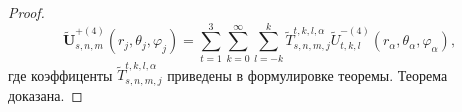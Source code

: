 \begin{proof}
\begin{equation}
\mathbf{\tilde U}_{s,n,m}^{+(4)}(r_j,\theta_j,\varphi_j)=\sum\limits_{t=1}^3\sum\limits_{k=0}^\infty\sum\limits_{l=-k}^k\tilde T_{s,n,m,j}^{t,k,l,\alpha}\tilde U_{t,k,l}^{-(4)}(r_\alpha,\theta_\alpha,\varphi_\alpha),
\label{eq:1:122r}
\end{equation}
где коэффиценты $\tilde T_{s,n,m,j}^{t,k,l,\alpha}$ приведены в формулировке теоремы. Теорема доказана.
\end{proof}


%
%
%
%
%
%
%
%
